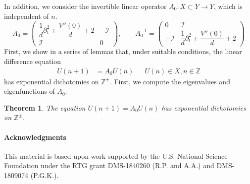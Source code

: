 \documentclass[12pt,reqno]{amsart}
\def\Z{{\mathbb Z}}
\def\id{{\mathcal I}}
\newtheorem{theorem}{Theorem}
\begin{document}
In addition, we consider the invertible linear operator $A_0: X \subset Y \rightarrow Y$, which is independent of $n$.
\begin{equation}\label{eq:A0}
A_0 = \begin{pmatrix}
\dfrac{1}{d}\partial_t^2 + \dfrac{V''(0)}{d} + 2 & -\id \\ \id & 0
\end{pmatrix}, \qquad
A_0^{-1} = \begin{pmatrix}
0 & \id \\ -\id & \dfrac{1}{d}\partial_t^2 + \dfrac{V''(0)}{d} + 2
\end{pmatrix}
\end{equation}
First, we show in a series of lemmas that, under suitable conditions, the linear difference equation
\begin{align}\label{eq:diffeq0}
U(n+1) &= A_0 U(n) && U(n) \in X, n \in \Z
\end{align}
has exponential dichotomies on $\Z^\pm$. First, we compute the eigenvalues and eigenfunctions of $A_0$.



\begin{theorem}The equation $U(n+1) = A_0 U(n)$ has exponential dichotomies on $\Z^\pm$.
\end{theorem}


\paragraph{Acknowledgments}

This material is based upon work supported by the U.S. National Science Foundation under the RTG grant DMS-1840260 (R.P. and A.A.)
and DMS-1809074 (P.G.K.).



\end{document}
